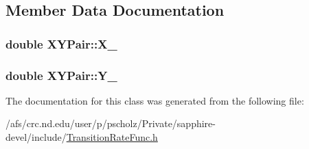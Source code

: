 \subsection{Member Data Documentation}
\hypertarget{classXYPair_a63810458e4feee03a846503f3d5aa9f2}{
\subsubsection[{X\-\_\-}]{\setlength{\rightskip}{0pt plus 5cm}double X\-Y\-Pair\-::\-X\-\_\-}}\label{classXYPair_a63810458e4feee03a846503f3d5aa9f2}
\hypertarget{classXYPair_aae7e2876bca240d1d21d5deedb3cba3e}{
\subsubsection[{Y\-\_\-}]{\setlength{\rightskip}{0pt plus 5cm}double X\-Y\-Pair\-::\-Y\-\_\-}}\label{classXYPair_aae7e2876bca240d1d21d5deedb3cba3e}


The documentation for this class was generated from the following file\-:\begin{DoxyCompactItemize}
\item 
/afs/crc.\-nd.\-edu/user/p/pscholz/\-Private/sapphire-\/devel/include/\hyperlink{TransitionRateFunc_8h}{Transition\-Rate\-Func.\-h}\end{DoxyCompactItemize}
